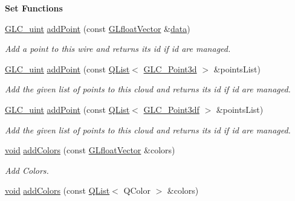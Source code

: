 \begin{Indent}{\bf Set Functions}\par
\begin{DoxyCompactItemize}
\item 
\hyperlink{glc__global_8h_abf950976fabed69026558df8e2da6c6b}{G\-L\-C\-\_\-uint} \hyperlink{class_g_l_c___point_cloud_a7cb82a49febf2498899284e7be5935b5}{add\-Point} (const \hyperlink{glc__global_8h_a9f3f0b00cd127b066c9931b9c257a046}{G\-Lfloat\-Vector} \&\hyperlink{glext_8h_a8850df0785e6fbcc2351af3b686b8c7a}{data})
\begin{DoxyCompactList}\small\item\em Add a point to this wire and returns its id if id are managed. \end{DoxyCompactList}\item 
\hyperlink{glc__global_8h_abf950976fabed69026558df8e2da6c6b}{G\-L\-C\-\_\-uint} \hyperlink{class_g_l_c___point_cloud_a8bc32a33556b45ef1305734752984e03}{add\-Point} (const \hyperlink{class_q_list}{Q\-List}$<$ \hyperlink{glc__vector3d_8h_a4e13a9bbc7ab3d34de7e98b41836772c}{G\-L\-C\-\_\-\-Point3d} $>$ \&points\-List)
\begin{DoxyCompactList}\small\item\em Add the given list of points to this cloud and returns its id if id are managed. \end{DoxyCompactList}\item 
\hyperlink{glc__global_8h_abf950976fabed69026558df8e2da6c6b}{G\-L\-C\-\_\-uint} \hyperlink{class_g_l_c___point_cloud_afb33aada8d7948d15eda064ff24e09be}{add\-Point} (const \hyperlink{class_q_list}{Q\-List}$<$ \hyperlink{glc__vector3df_8h_a433841665e7ab0e1f29a0c68ce0d1cc7}{G\-L\-C\-\_\-\-Point3df} $>$ \&points\-List)
\begin{DoxyCompactList}\small\item\em Add the given list of points to this cloud and returns its id if id are managed. \end{DoxyCompactList}\item 
\hyperlink{group___u_a_v_objects_plugin_ga444cf2ff3f0ecbe028adce838d373f5c}{void} \hyperlink{class_g_l_c___point_cloud_a6992df37f365b63aadaa901167fc6f87}{add\-Colors} (const \hyperlink{glc__global_8h_a9f3f0b00cd127b066c9931b9c257a046}{G\-Lfloat\-Vector} \&colors)
\begin{DoxyCompactList}\small\item\em Add Colors. \end{DoxyCompactList}\item 
\hyperlink{group___u_a_v_objects_plugin_ga444cf2ff3f0ecbe028adce838d373f5c}{void} \hyperlink{class_g_l_c___point_cloud_ae074c4ed3935c71d09f86283014b6a3b}{add\-Colors} (const \hyperlink{class_q_list}{Q\-List}$<$ Q\-Color $>$ \&colors)

\end{DoxyCompactItemize}
\end{Indent}
